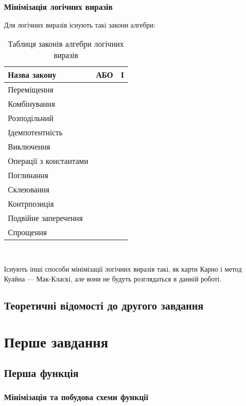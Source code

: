 \subsection{Мінімізація логічних виразів}
Для логічних виразів існують такі закони алгебри:
\begin{center}
\begin{table}[h!]
\begin{tabu} { | X[3,с] | X[3,c] | X[3,c] | }
 \hline
Назва закону& АБО & І \\
 \hline
 Переміщення &  &  \\
\hline
 Комбінування &  &    \\
\hline
Розподільний &  &   \\
\hline
Ідемпотентність & &   \\
\hline
Виключення & &   \\
\hline
Операції з константами & &   \\
\hline
Поглинання & &   \\
\hline
Склеювання& &   \\
\hline
Контрпозиція& &   \\
\hline
Подвійне заперечення& &   \\
\hline
Спрощення& &   \\
\hline 
\end{tabu}
\vspace{6mm}\\
\caption{Таблиця законів алгебри логічних виразів}\label{tab:logic}
\end{table}
\end{center}

Існують інші способи мінімізації логічних виразів такі, як карти Карно і метод Куайна — Мак-Класкі, але вони не будуть розглядаться в данній роботі.
\newpage
\section{Теоретичні відомості до другого завдання}

\newpage
\chapter{Перше завдання}
\section{Перша функція}
\newpage
\subsection{Мінімізація та побудова схеми функції}


